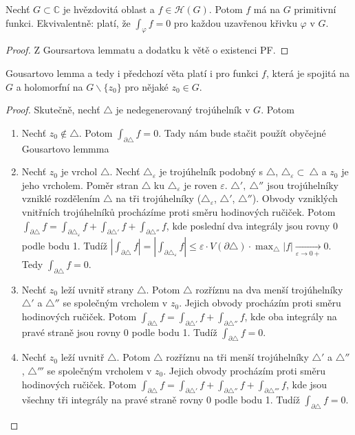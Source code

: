 \begin{theorem}
Nechť $G \subset \mathbb{C}$ je hvězdovitá oblast a  $f \in \mathcal{H}(G)$. Potom $f$ má na $G$ primitivní funkci. Ekvivalentně: platí, že $\int_\varphi f=0$ pro každou uzavřenou křivku $\varphi$ v $G$.
\end{theorem}

\begin{proof}
Z Goursartova lemmatu a dodatku k větě o existenci PF.
\end{proof}

\begin{note} %
Gousartovo lemma a tedy i předchozí věta platí i pro funkci $f$, která je spojitá na $G$ a holomorfní na $G \backslash \{z_0\}$ pro nějaké $z_0 \in G$.
\end{note}

\begin{proof}
Skutečně, nechť $\triangle$ je nedegenerovaný trojúhelník v $G$. Potom
\begin{enumerate}
    \item Nechť $z_0 \notin \triangle$. Potom $\int_{\partial\triangle}f=0$. Tady nám bude stačit použít obyčejné Gousartovo lemmma
    \item Nechť $z_0$ je vrchol $\triangle$. Nechť $\triangle_\varepsilon$ je trojúhelník podobný s $\triangle$, $\triangle_\varepsilon\subset\ \triangle$
    a
    $z_{0}$ je jeho
    vrcholem. Poměr stran $\triangle$ ku 
    $\triangle_\varepsilon$ je
    roven $\varepsilon$. $\triangle',\ \triangle''$ jsou trojúhelníky vzniklé rozdělením $\triangle$ na tři trojúhelníky ($\triangle_\varepsilon$, $\triangle'$, $\triangle''$). Obvody vzniklých vnitřních trojúhelníků procházíme proti směru hodinových ručiček.
    Potom $\int_{\partial\triangle}f=\int_{\partial\triangle_\varepsilon}f+\int_{\partial\triangle'}f+\int_{\partial\triangle''}f$, kde poslední dva integrály jsou rovny $0$ podle bodu 1. Tudíž $|\int_{\partial\triangle}f|=|\int_{\partial\triangle_\varepsilon}f| \le \varepsilon \cdot V(\partial\triangle) \cdot \max_\triangle |f| \xrightarrow[\varepsilon \rightarrow 0+]{}0$. Tedy  $\int_{\partial\triangle} f=0$.
    \item Nechť $z_0$ leží uvnitř strany $\triangle$. Potom $\triangle$ rozříznu na dva menší trojúhelníky $\triangle'$ a $\triangle''$ se společným vrcholem v $z_{0}$. Jejich obvody procházím proti směru hodinových ručiček. Potom $\int_{\partial\triangle}f=\int_{\partial\triangle'}f+\int_{\partial\triangle''}f$, kde oba integrály na pravé straně jsou rovny $0$ podle bodu 1. Tudíž $\int_{\partial\triangle}f=0$.
    \item Nechť $z_0$ leží uvnitř $\triangle$. Potom $\triangle$ rozříznu na tři menší trojúhelníky $\triangle'$ a $\triangle''$, $\triangle'''$ se společným vrcholem v $z_{0}$. Jejich obvody procházím proti směru hodinových ručiček. Potom $\int_{\partial\triangle}f=\int_{\partial\triangle'}f+\int_{\partial\triangle''}f+\int_{\partial\triangle'''}f$, kde jsou všechny tři integrály na pravé straně rovny $0$ podle bodu 1. Tudíž $\int_{\partial\triangle}f=0$.
\end{enumerate}
\end{proof}

